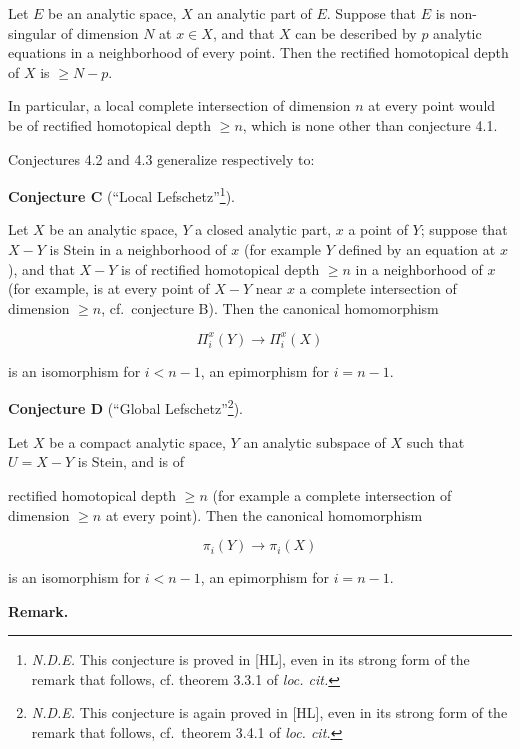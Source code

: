 \documentclass[
  11pt,
  a4paper,
]{book}
\newcounter{none} %
\begin{document}
Let \(E\) be an analytic space, \(X\) an analytic part of \(E\). Suppose
that \(E\) is non-singular of dimension \(N\) at \(x \in
X\), and that \(X\) can be described by \(p\) analytic equations in a
neighborhood of every point. Then the rectified homotopical depth of
\(X\) is \(\geqslant N - p\).

In particular, a local complete intersection of dimension \(n\) at every
point would be of rectified homotopical depth \(\geqslant n\), which is
none other than conjecture 4.1.

Conjectures 4.2 and 4.3 generalize respectively to:

\textbf{Conjecture C} (``Local Lefschetz''\footnote{\emph{N.D.E.} This
  conjecture is proved in {[}HL{]}, even in its strong form of the
  remark that follows, cf. theorem 3.3.1 of \emph{loc. cit.}}).

Let \(X\) be an analytic space, \(Y\) a closed analytic part, \(x\) a
point of \(Y\); suppose that \(X - Y\) is Stein in a neighborhood of
\(x\) (for example \(Y\) defined by an equation at \(x\)), and that
\(X - Y\) is of rectified homotopical depth \(\geqslant n\) in a
neighborhood of \(x\) (for example, is at every point of \(X - Y\) near
\(x\) a complete intersection of dimension \(\geqslant n\),
cf.~conjecture B). Then the canonical homomorphism

\[ \Pi^{x}_{i}(Y) \to \Pi^{x}_{i}(X) \]

is an isomorphism for \(i < n - 1\), an epimorphism for \(i = n - 1\).

\textbf{Conjecture D} (``Global Lefschetz''\footnote{\emph{N.D.E.} This
  conjecture is again proved in {[}HL{]}, even in its strong form of the
  remark that follows, cf.~theorem 3.4.1 of \emph{loc. cit.}}).

Let \(X\) be a compact analytic space, \(Y\) an analytic subspace of
\(X\) such that \(U = X - Y\) is Stein, and is of

rectified homotopical depth \(\geqslant n\) (for example a complete
intersection of dimension \(\geqslant n\) at every point). Then the
canonical homomorphism

\[ \pi_{i}(Y) \to \pi_{i}(X) \]

is an isomorphism for \(i < n - 1\), an epimorphism for \(i = n - 1\).

\textbf{Remark.}
\end{document}
